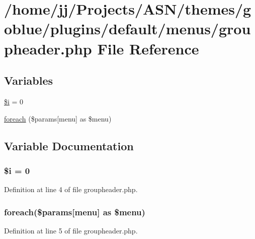\hypertarget{groupheader_8php}{}\section{/home/jj/\+Projects/\+A\+S\+N/themes/goblue/plugins/default/menus/groupheader.php File Reference}
\label{groupheader_8php}
\subsection*{Variables}
\begin{DoxyCompactItemize}
\item 
\hyperlink{groupheader_8php_a83018d9153d17d91fbcf3bc10158d34f}{\$i} = 0
\item 
\hyperlink{groupheader_8php_a1b18c909b5f0affc85267f294d947c4b}{foreach} (\$params\mbox{[}\textquotesingle{}menu\textquotesingle{}\mbox{]} as \$menu)
\end{DoxyCompactItemize}


\subsection{Variable Documentation}
\subsubsection[{\texorpdfstring{\$i}{$i}}]{\setlength{\rightskip}{0pt plus 5cm}\${\bf i} = 0}\hypertarget{groupheader_8php_a83018d9153d17d91fbcf3bc10158d34f}{}\label{groupheader_8php_a83018d9153d17d91fbcf3bc10158d34f}


Definition at line 4 of file groupheader.\+php.

\subsubsection[{\texorpdfstring{foreach}{foreach}}]{\setlength{\rightskip}{0pt plus 5cm}foreach(\$params\mbox{[}\textquotesingle{}menu\textquotesingle{}\mbox{]} as \$menu)}\hypertarget{groupheader_8php_a1b18c909b5f0affc85267f294d947c4b}{}\label{groupheader_8php_a1b18c909b5f0affc85267f294d947c4b}


Definition at line 5 of file groupheader.\+php.

